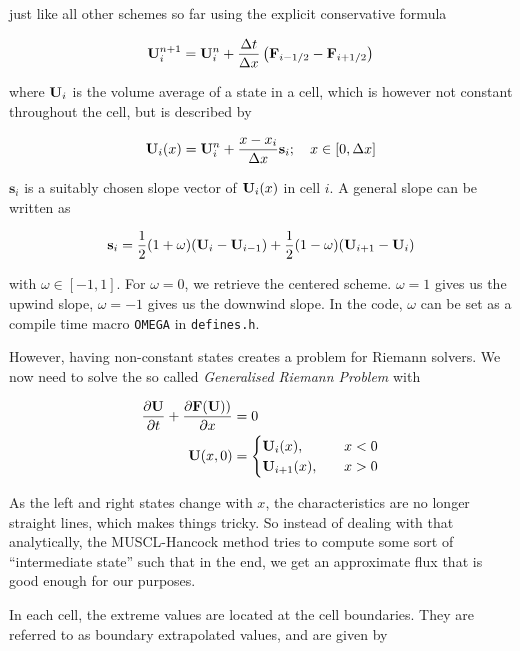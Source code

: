 just like all other schemes so far using the explicit conservative formula

\begin{equation}
	\mathbf{U}_i^{n+1} = \mathbf{U}_i^n + \frac{\Delta t}{\Delta x} \left( \mathbf{F}_{i-1/2} - \mathbf{F}_{i + 1/2} \right)
\end{equation}

where $\mathbf{U}_i$ is the volume average of a state in a cell, which is however not constant throughout the cell, but is described by

\begin{equation}
	\mathbf{U}_{i}(x) = \mathbf{U}_i^n + \frac{x - x_i}{\Delta x} \mathbf{s}_i; \quad x \in [0, \Delta x]
\end{equation}


$\mathbf{s}_i$ is a suitably chosen slope vector of $\mathbf{U}_i(x)$ in cell $i$.
A general slope can be written as

\begin{equation}
 	\mathbf{s}_i = \frac{1}{2} (1 + \omega) (\mathbf{U}_i - \mathbf{U}_{i-1}) + \frac{1}{2} (1 - \omega) (\mathbf{U}_{i+1} - \mathbf{U}_i)
\end{equation}

with $\omega \in [-1, 1]$.
For $\omega = 0$, we retrieve the centered scheme.
$\omega = 1$ gives us the upwind slope, $\omega = -1$ gives us the downwind slope.
In the code, $\omega$ can be set as a compile time macro \texttt{OMEGA} in \texttt{defines.h}.


However, having non-constant states creates a problem for Riemann solvers.
We now need to solve the so called \emph{Generalised Riemann Problem} with

\begin{align}
	\frac{\partial \mathbf{U}}{\partial t} + \frac{\partial \mathbf{F}(\mathbf{U}))}{\partial x} &= 0 \\
	\mathbf{U}(x, 0) &= 
	\begin{cases}
		\mathbf{U}_i(x), & \quad x < 0 \\
		\mathbf{U}_{i+1}(x), & \quad x > 0 \\
	\end{cases}
\end{align}

As the left and right states change with $x$, the characteristics are no longer straight lines, which makes things tricky.
So instead of dealing with that analytically, the MUSCL-Hancock method tries to compute some sort of ``intermediate state'' such that in the end, we get an approximate flux that is good enough for our purposes.

In each cell, the extreme values are located at the cell boundaries.
They are referred to as boundary extrapolated values, and are given by

